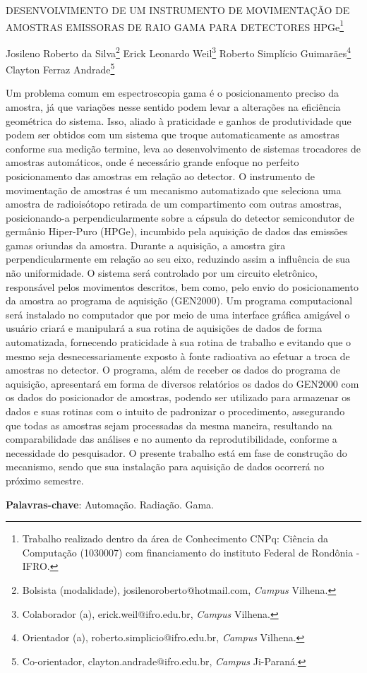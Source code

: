 \documentclass[article,12pt,onesidea,4paper,english,brazil]{abntex2}
\begin{document}
	
	
	\frenchspacing 
	
	\begin{center}
		\LARGE DESENVOLVIMENTO DE UM INSTRUMENTO DE MOVIMENTAÇÃO DE
		AMOSTRAS EMISSORAS DE RAIO GAMA PARA DETECTORES HPGe\footnote{Trabalho realizado dentro da área de Conhecimento CNPq: Ciência da Computação (1030007) com
		financiamento do instituto Federal de Rondônia - IFRO.}
		
		\normalsize
		Josileno Roberto da Silva\footnote{Bolsista (modalidade), josilenoroberto@hotmail.com, \textit{Campus} Vilhena.} 
		Erick Leonardo Weil\footnote{Colaborador (a), erick.weil@ifro.edu.br, \textit{Campus} Vilhena.} 
		Roberto Simplício Guimarães\footnote{Orientador (a), roberto.simplicio@ifro.edu.br, \textit{Campus} Vilhena.} 
		Clayton Ferraz Andrade\footnote{Co-orientador, clayton.andrade@ifro.edu.br, \textit{Campus} Ji-Paraná.} 
	\end{center}
	
	\noindent Um problema comum em espectroscopia gama é o posicionamento preciso da
	amostra, já que variações nesse sentido podem levar a alterações na eficiência
	geométrica do sistema. Isso, aliado à praticidade e ganhos de produtividade que
	podem ser obtidos com um sistema que troque automaticamente as amostras
	conforme sua medição termine, leva ao desenvolvimento de sistemas trocadores de
	amostras automáticos, onde é necessário grande enfoque no perfeito
	posicionamento das amostras em relação ao detector. O instrumento de
	movimentação de amostras é um mecanismo automatizado que seleciona uma
	amostra de radioisótopo retirada de um compartimento com outras amostras,
	posicionando-a perpendicularmente sobre a cápsula do detector semicondutor de
	germânio Hiper-Puro (HPGe), incumbido pela aquisição de dados das emissões
	gamas oriundas da amostra. Durante a aquisição, a amostra gira
	perpendicularmente em relação ao seu eixo, reduzindo assim a influência de sua
	não uniformidade. O sistema será controlado por um circuito eletrônico, responsável
	pelos movimentos descritos, bem como, pelo envio do posicionamento da amostra
	ao programa de aquisição (GEN2000). Um programa computacional será instalado
	no computador que por meio de uma interface gráfica amigável o usuário criará e
	manipulará a sua rotina de aquisições de dados de forma automatizada, fornecendo
	praticidade à sua rotina de trabalho e evitando que o mesmo seja
	desnecessariamente exposto à fonte radioativa ao efetuar a troca de amostras no
	detector. O programa, além de receber os dados do programa de aquisição,
	apresentará em forma de diversos relatórios os dados do GEN2000 com os dados
	do posicionador de amostras, podendo ser utilizado para armazenar os dados e
	suas rotinas com o intuito de padronizar o procedimento, assegurando que todas as
	amostras sejam processadas da mesma maneira, resultando na comparabilidade
	das análises e no aumento da reprodutibilidade, conforme a necessidade do
	pesquisador. O presente trabalho está em fase de construção do mecanismo, sendo
	que sua instalação para aquisição de dados ocorrerá no próximo semestre.
	
	\vspace{\onelineskip}
	
	\noindent
	\textbf{Palavras-chave}: Automação. Radiação. Gama.
	
\end{document}
